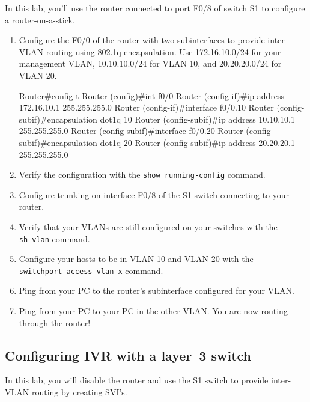In this lab, you'll use the router connected to port F0/8 of switch S1
to configure a router-on-a-stick.

\begin{enumerate}
\item
  Configure the F0/0 of the router with two subinterfaces to provide
  inter-VLAN routing using 802.1q encapsulation. Use 172.16.10.0/24 for
  your management VLAN, 10.10.10.0/24 for VLAN 10, and 20.20.20.0/24 for
  VLAN 20.

\begin{cli}
Router#config t
Router (config)#int f0/0
Router (config-if)#ip address 172.16.10.1 255.255.255.0
Router (config-if)#interface f0/0.10
Router (config-subif)#encapsulation dot1q 10
Router (config-subif)#ip address 10.10.10.1 255.255.255.0
Router (config-subif)#interface f0/0.20
Router (config-subif)#encapsulation dot1q 20
Router (config-subif)#ip address 20.20.20.1 255.255.255.0
\end{cli}
\item
  Verify the configuration with the \texttt{show\ running-config}
  command.
\item
  Configure trunking on interface F0/8 of the S1 switch connecting to
  your router.
\item
  Verify that your VLANs are still configured on your switches with the
  \texttt{sh\ vlan} command.
\item
  Configure your hosts to be in VLAN 10 and VLAN 20 with the
  \texttt{switchport\ access\ vlan\ x} command.
\item
  Ping from your PC to the router's subinterface configured for your
  VLAN.
\item
  Ping from your PC to your PC in the other VLAN. You are now routing
  through the router!
\end{enumerate}

\subsection{Configuring IVR with a layer~3 switch}

In this lab, you will disable the router and use the S1 switch to
provide inter-VLAN routing by creating SVI's.

